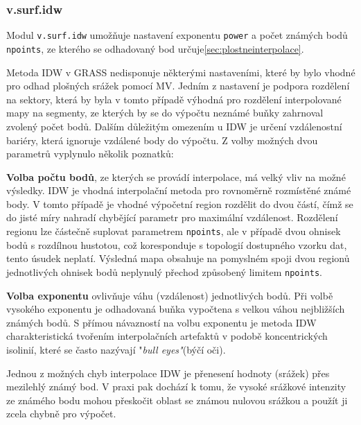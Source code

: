 \documentclass[a4paper,12pt,oneside]{report}
\begin{document}
\subsubsection*{v.surf.idw}
Modul \texttt{v.surf.idw} umožňuje nastavení exponentu \texttt{power}
a počet známých bodů \texttt{npoints}, ze kterého se odhadovaný bod
určuje\ref{sec:plostneinterpolace}.

Metoda IDW v GRASS nedisponuje některými nastaveními, které by bylo vhodné
pro odhad plošných srážek pomocí MV. Jedním z nastavení je
podpora rozdělení na sektory, která by byla v tomto případě výhodná
pro rozdělení interpolované mapy na segmenty, ze kterých by se do
výpočtu neznámé buňky zahrnoval zvolený počet bodů. Dalším důležitým
omezením u IDW je určení vzdálenostní bariéry, která ignoruje vzdálené
body do výpočtu. Z volby možných dvou parametrů vyplynulo několik
poznatků:

\begin{description}
\item \textbf{Volba počtu bodů}, ze kterých se provádí interpolace, má
  velký vliv na možné výsledky. IDW je vhodná interpolační metoda pro
  rovnoměrně rozmístěné známé body. V tomto případě je vhodné
  výpočetní region rozdělit do dvou částí, čímž se do jisté míry
  nahradí chybějící parametr pro maximální vzdálenost. Rozdělení
  regionu lze částečně suplovat parametrem \texttt{npoints}, ale v
  případě dvou ohnisek bodů s rozdílnou hustotou, což koresponduje s
  topologií dostupného vzorku dat, tento úsudek neplatí. Výsledná mapa
  obsahuje na pomyslném spoji dvou regionů jednotlivých ohnisek bodů
  neplynulý přechod způsobený limitem \texttt{npoints}.

\item \textbf{Volba exponentu} ovlivňuje váhu (vzdálenost)
  jednotlivých bodů. Při volbě vysokého exponentu je odhadovaná buňka
  vypočtena s velkou váhou nej\-bližších známých bodů. S přímou
  návazností na volbu exponentu je metoda IDW charakteristická
  tvořením interpolačních artefaktů v podobě koncentrických isolinií,
  které se často nazývají "\textit{bull eyes"}(býčí oči).
\end{description} 



Jednou z možných chyb interpolace IDW je přenesení hodnoty (srážek)
přes mezilehlý známý bod. V praxi pak dochází k tomu, že vysoké
srážkové intenzity ze známého bodu mohou přeskočit oblast se známou
nulovou srážkou a použít ji zcela chybně pro výpočet.
\end{document}
